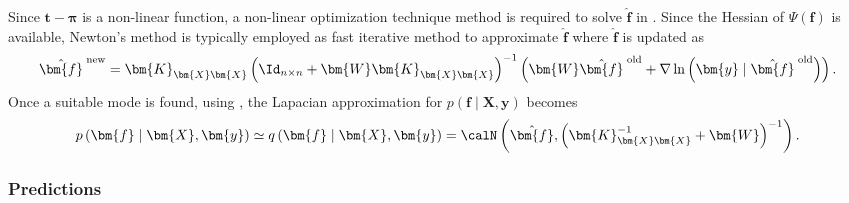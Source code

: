 Since $\bm{t} - \bm{\pi}$ is a non-linear function, a non-linear optimization technique method is required to solve $\hat{\bm{f}}$ in  . Since the Hessian of $\Psi \left( \bm{f} \right)$ is available, Newton's method is typically employed as fast iterative method to approximate $\hat{\bm{f}}$ where $\hat{\bm{f}}$ is updated as
\begin{equation*}
    \hat{\bm{f}}^{\; \text{new}} = \bm{K}_{\bm{X} \bm{X}} \left( \Id_{n \times n} + \bm{W} \bm{K}_{\bm{X} \bm{X}} \right)^{-1} \left( \bm{W} \hat{\bm{f}}^{\; \text{old}} + \nabla \ln \left( \bm{y} \mid \hat{\bm{f}}^{\; \text{old}} \right) \right).
\end{equation*}
Once a suitable mode is found, using , the Lapacian approximation for $p \left( \bm{f} \mid \bm{X} , \bm{y} \right)$ becomes
\begin{equation} \label{eq: lapace-apprx}
    p \left( \bm{f} \mid \bm{X} , \bm{y} \right) \simeq q \left( \bm{f} \mid \bm{X} , \bm{y} \right) = \calN \left( \hat{\bm{f}} , \left( \bm{K}_{\bm{X} \bm{X}}^{-1} + \bm{W} \right)^{-1} \right).
\end{equation}

\subsubsection{Predictions}\label{Section1.6.3}

